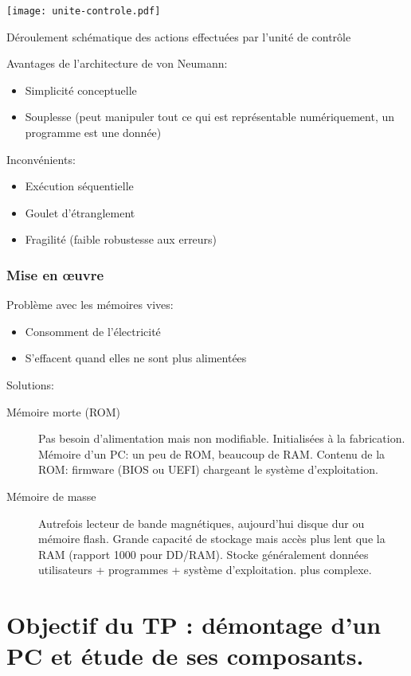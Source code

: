 \begin{multicols}{2}
\begin{center}
  \texttt{[image: unite-controle.pdf]}
  
  {Déroulement schématique des actions effectuées par l'unité de contrôle}

\end{center}

\noindent Avantages de l'architecture de von Neumann:
\begin{itemize}
\item Simplicité conceptuelle
\item Souplesse (peut manipuler tout ce qui est représentable
  numériquement, un programme est une donnée)
\end{itemize}
Inconvénients:
\begin{itemize}
\item Exécution séquentielle
\item Goulet d'étranglement
\item Fragilité (faible robustesse aux erreurs)
\end{itemize}
\subsubsection*{Mise en œuvre}

Problème avec les mémoires vives:
\begin{itemize}
\item Consomment de l'électricité
\item S'effacent quand elles ne sont plus alimentées
\end{itemize}
 
Solutions:
\begin{description}
\item[Mémoire morte (ROM)] Pas besoin d'alimentation mais non
  modifiable. Initialisées à la fabrication. Mémoire d'un PC: un peu
  de ROM, beaucoup de RAM. Contenu de la ROM: firmware (BIOS ou UEFI)
  chargeant le système d'exploitation.
\item[Mémoire de masse] Autrefois lecteur de bande magnétiques,
  aujourd'hui disque dur ou mémoire flash. Grande capacité de stockage
  mais accès plus lent que la RAM (rapport 1000 pour DD/RAM). Stocke
  généralement données utilisateurs + programmes + système d'exploitation.
  plus complexe.
\end{description}

\section*{Objectif du TP : démontage d'un PC et étude de ses composants.}\label{sec.demontage}


\end{multicols}
